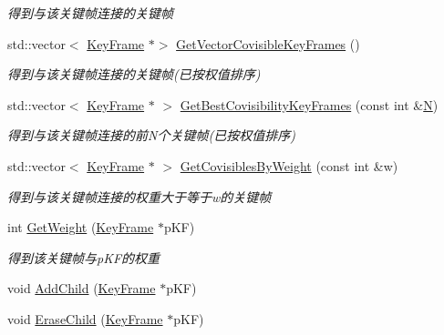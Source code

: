 \begin{DoxyCompactItemize}
\begin{DoxyCompactList}\small\item\em 得到与该关键帧连接的关键帧 \end{DoxyCompactList}\item 
std\+::vector$<$ \mbox{\hyperlink{class_o_r_b___s_l_a_m2_1_1_key_frame}{Key\+Frame}} $\ast$$>$ \mbox{\hyperlink{class_o_r_b___s_l_a_m2_1_1_key_frame_a9315d396634f6637f70f716336777b8d}{Get\+Vector\+Covisible\+Key\+Frames}} ()
\begin{DoxyCompactList}\small\item\em 得到与该关键帧连接的关键帧(已按权值排序) \end{DoxyCompactList}\item 
std\+::vector$<$ \mbox{\hyperlink{class_o_r_b___s_l_a_m2_1_1_key_frame}{Key\+Frame}} $\ast$ $>$ \mbox{\hyperlink{class_o_r_b___s_l_a_m2_1_1_key_frame_a2ecb2df01af804fb727c93948a28475f}{Get\+Best\+Covisibility\+Key\+Frames}} (const int \&\mbox{\hyperlink{class_o_r_b___s_l_a_m2_1_1_key_frame_ac9b6948404d0ade2779335708cd443b9}{N}})
\begin{DoxyCompactList}\small\item\em 得到与该关键帧连接的前\+N个关键帧(已按权值排序) \end{DoxyCompactList}\item 
std\+::vector$<$ \mbox{\hyperlink{class_o_r_b___s_l_a_m2_1_1_key_frame}{Key\+Frame}} $\ast$ $>$ \mbox{\hyperlink{class_o_r_b___s_l_a_m2_1_1_key_frame_a7047bffbf130b00dd0270df99874f8a1}{Get\+Covisibles\+By\+Weight}} (const int \&w)
\begin{DoxyCompactList}\small\item\em 得到与该关键帧连接的权重大于等于w的关键帧 \end{DoxyCompactList}\item 
int \mbox{\hyperlink{class_o_r_b___s_l_a_m2_1_1_key_frame_ab10fd3aab6431face352a930961ff713}{Get\+Weight}} (\mbox{\hyperlink{class_o_r_b___s_l_a_m2_1_1_key_frame}{Key\+Frame}} $\ast$p\+KF)
\begin{DoxyCompactList}\small\item\em 得到该关键帧与p\+K\+F的权重 \end{DoxyCompactList}\item 
void \mbox{\hyperlink{class_o_r_b___s_l_a_m2_1_1_key_frame_a2394adfb627d9cf87ed8da78f6b0d709}{Add\+Child}} (\mbox{\hyperlink{class_o_r_b___s_l_a_m2_1_1_key_frame}{Key\+Frame}} $\ast$p\+KF)
\item 
void \mbox{\hyperlink{class_o_r_b___s_l_a_m2_1_1_key_frame_aefdd69627fd6a204a6ef4539303b81f6}{Erase\+Child}} (\mbox{\hyperlink{class_o_r_b___s_l_a_m2_1_1_key_frame}{Key\+Frame}} $\ast$p\+KF)
$$
\end{DoxyCompactItemize}
